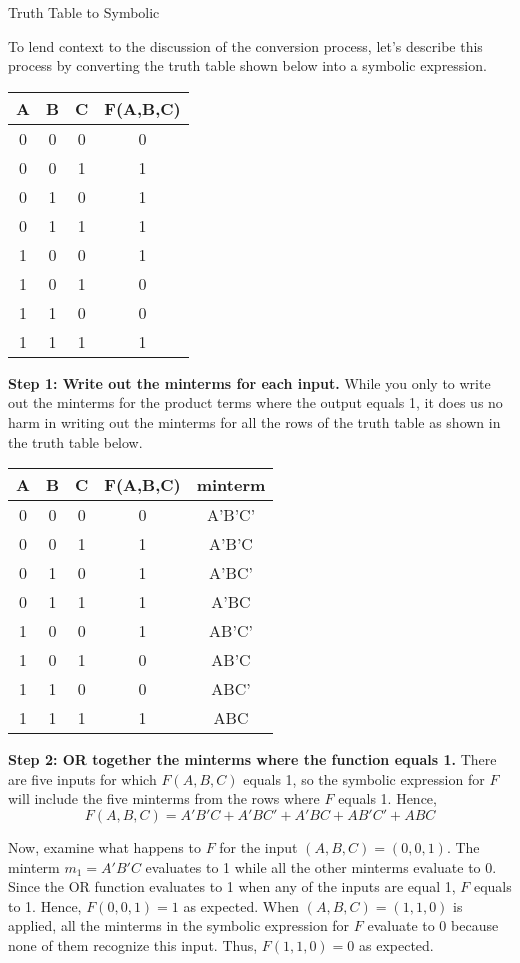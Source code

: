 \begin{process}{Truth Table to Symbolic}
\label{process:representationTTtoSymbolic}

To lend context to the discussion of the conversion process, let's describe this
process by converting the truth table shown below into a symbolic expression.

\begin{tabular}{c|c|c||c}
A & B & C & F(A,B,C)        \\ \hline
0 & 0 & 0 & 0        \\ \hline
0 & 0 & 1 & 1        \\ \hline
0 & 1 & 0 & 1        \\ \hline
0 & 1 & 1 & 1        \\ \hline
1 & 0 & 0 & 1        \\ \hline
1 & 0 & 1 & 0        \\ \hline
1 & 1 & 0 & 0        \\ \hline
1 & 1 & 1 & 1        \\
\end{tabular}

\textbf{Step 1: Write out the minterms for each input.}
While you only  to write out the minterms for the product
terms where the output equals 1, it does us no harm in writing out the minterms
for all the rows of the truth table as shown in the truth table below.

\begin{tabular}{c|c|c||c|c}
A & B & C & F(A,B,C)    & minterm    \\ \hline
0 & 0 & 0 & 0        & A'B'C'      \\ \hline
0 & 0 & 1 & 1        & A'B'C        \\ \hline
0 & 1 & 0 & 1        & A'BC'       \\ \hline
0 & 1 & 1 & 1        & A'BC       \\ \hline
1 & 0 & 0 & 1        & AB'C'      \\ \hline
1 & 0 & 1 & 0        & AB'C          \\ \hline
1 & 1 & 0 & 0        & ABC'        \\ \hline
1 & 1 & 1 & 1        & ABC          \\
\end{tabular}
\vspace{0.2mm}

\textbf{Step 2: OR together the minterms where the function equals 1.}
There are five inputs for which $F(A,B,C)$ equals 1, so the symbolic
expression for $F$ will include the five minterms from the rows where
$F$ equals 1.  Hence,
$$F(A,B,C) =  A'B'C + A'BC' + A'BC + AB'C' + ABC$$

Now, examine what happens to $F$ for the input $(A,B,C)=(0,0,1)$.
The minterm $m_1=A'B'C$ evaluates to 1 while all the other minterms
evaluate to 0.  Since the OR function evaluates to 1 when any of
the inputs are equal 1, $F$ equals to 1. Hence, $F(0,0,1)=1$ as
expected.  When $(A,B,C)=(1,1,0)$ is applied, all the
minterms in the symbolic expression for $F$ evaluate to 0 because
none of them recognize this input.  Thus, $F(1,1,0)=0$ as expected.
\end{process}

